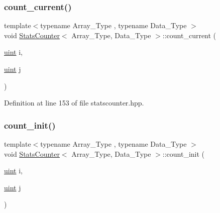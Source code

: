 \mbox{\label{class_stats_counter_ab81166f7cb67eeaecc469016d237019a}} 
\subsubsection{\texorpdfstring{count\+\_\+current()}{count\_current()}}
{\footnotesize\ttfamily template$<$typename Array\+\_\+\+Type , typename Data\+\_\+\+Type $>$ \\
void \hyperlink{class_stats_counter}{Stats\+Counter}$<$ Array\+\_\+\+Type, Data\+\_\+\+Type $>$\+::count\+\_\+current (\begin{DoxyParamCaption}\item[{\hyperlink{typedefs_8hpp_a91ad9478d81a7aaf2593e8d9c3d06a14}{uint}}]{i,  }\item[{\hyperlink{typedefs_8hpp_a91ad9478d81a7aaf2593e8d9c3d06a14}{uint}}]{j }\end{DoxyParamCaption})\hspace{0.3cm}{\ttfamily [inline]}}



Definition at line 153 of file statscounter.\+hpp.

\mbox{\label{class_stats_counter_a19bd5936619e190c0d8918b4f343922e}} 
\subsubsection{\texorpdfstring{count\+\_\+init()}{count\_init()}}
{\footnotesize\ttfamily template$<$typename Array\+\_\+\+Type , typename Data\+\_\+\+Type $>$ \\
void \hyperlink{class_stats_counter}{Stats\+Counter}$<$ Array\+\_\+\+Type, Data\+\_\+\+Type $>$\+::count\+\_\+init (\begin{DoxyParamCaption}\item[{\hyperlink{typedefs_8hpp_a91ad9478d81a7aaf2593e8d9c3d06a14}{uint}}]{i,  }\item[{\hyperlink{typedefs_8hpp_a91ad9478d81a7aaf2593e8d9c3d06a14}{uint}}]{j }\end{DoxyParamCaption})\hspace{0.3cm}{\ttfamily [inline]}}



